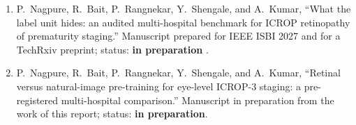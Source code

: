 \noindent\begin{enumerate}
\item P.~Nagpure, R.~Bait, P.~Rangnekar, Y.~Shengale, and A.~Kumar, ``What the label unit hides: an audited multi-hospital benchmark for ICROP retinopathy of prematurity staging.'' Manuscript prepared for IEEE ISBI 2027 and for a TechRxiv preprint; status: \textbf{in preparation} .
\item P.~Nagpure, R.~Bait, P.~Rangnekar, Y.~Shengale, and A.~Kumar, ``Retinal versus natural-image pre-training for eye-level ICROP-3 staging: a pre-registered multi-hospital comparison.'' Manuscript in preparation from the work of this report; status: \textbf{in preparation}.
\end{enumerate}
\clearpage
